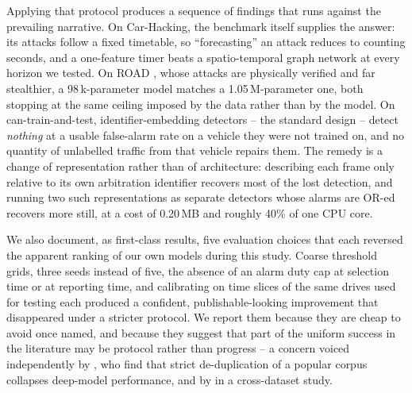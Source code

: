 \documentclass[preprint,11pt,authoryear]{elsarticle}
\begin{document}
Applying that protocol produces a sequence of findings that runs against the prevailing narrative.
On Car-Hacking, the benchmark itself supplies the answer: its attacks follow a fixed timetable, so
``forecasting'' an attack reduces to counting seconds, and a one-feature timer beats a
spatio-temporal graph network at every horizon we tested. On ROAD \citep{verma2024road}, whose
attacks are physically verified and far stealthier, a 98\,k-parameter model matches a
1.05\,M-parameter one, both stopping at the same ceiling imposed by the data rather than by the
model. On can-train-and-test, identifier-embedding detectors -- the standard design -- detect
\emph{nothing} at a usable false-alarm rate on a vehicle they were not trained on, and no quantity
of unlabelled traffic from that vehicle repairs them. The remedy is a change of representation
rather than of architecture: describing each frame only relative to its own arbitration identifier
recovers most of the lost detection, and running two such representations as separate detectors
whose alarms are OR-ed recovers more still, at a cost of 0.20\,MB and roughly 40\% of one CPU core.

We also document, as first-class results, five evaluation choices that each reversed the apparent
ranking of our own models during this study. Coarse threshold grids, three seeds instead of five,
the absence of an alarm duty cap at selection time or at reporting time, and calibrating on time
slices of the same drives used for testing each produced a confident, publishable-looking
improvement that disappeared under a stricter protocol. We report them because they are cheap to
avoid once named, and because they suggest that part of the uniform success in the literature may be
protocol rather than progress -- a concern voiced independently by \citet{le2026cicio}, who find that
strict de-duplication of a popular corpus collapses deep-model performance, and by
\citet{koltai2026cantrust} in a cross-dataset study.
\end{document}
